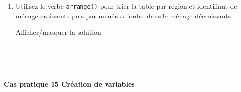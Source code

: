 \documentclass[12pt,]{article}
\newenvironment{Shaded}{}{}
\newcommand{\KeywordTok}[1]{\textcolor[rgb]{0.00,0.00,1.00}{{#1}}}
\newcommand{\StringTok}[1]{\textcolor[rgb]{0.00,0.50,0.50}{{#1}}}
\newcommand{\CommentTok}[1]{\textcolor[rgb]{0.00,0.50,0.00}{{#1}}}
\newcommand{\NormalTok}[1]{{#1}}
\let\oldparagraph\paragraph
\renewcommand{\paragraph}[1]{\oldparagraph{#1}\mbox{}}
\begin{document}
\begin{enumerate}
  ~
\item
  Utilisez le verbe \texttt{arrange()} pour trier la table par région et
  identifiant de ménage croissants puis par numéro d'ordre dans le
  ménage décroissants.

  Afficher/masquer la solution

  \hypertarget{sol50}{}
\begin{Shaded}
\end{Shaded}

  ~
\end{enumerate}

~

\paragraph{\texorpdfstring{\textbf{Cas pratique 15} Création de
variables}{Cas pratique 15 Création de variables}}\label{cas-pratique-15-creation-de-variables}
\end{document}
